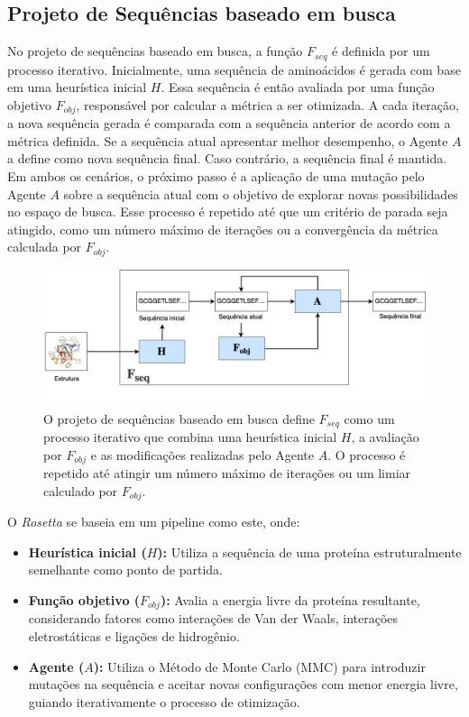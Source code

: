 \subsection{Projeto de Sequências baseado em busca}

No projeto de sequências baseado em busca, 
a função $F_{seq}$ é definida por um processo iterativo. 
Inicialmente, uma sequência de aminoácidos é gerada com base em uma heurística inicial $H$.
Essa sequência é então avaliada por uma função objetivo $F_{obj}$, 
responsável por calcular a métrica a ser otimizada.
A cada iteração, 
a nova sequência gerada é comparada com a sequência anterior de acordo com a métrica definida. 
Se a sequência atual apresentar melhor desempenho, o Agente $A$ a define como nova sequência final.
Caso contrário, a sequência final é mantida. 
Em ambos os cenários, o próximo passo é a aplicação de uma mutação pelo Agente $A$ sobre 
a sequência atual com o objetivo de explorar novas possibilidades no espaço de busca.
Esse processo é repetido até que um critério de parada seja atingido, 
como um número máximo de iterações ou a convergência da métrica calculada por $F_{obj}$.


\begin{figure}[H]
  \centering
  \includegraphics[width=.8\textwidth]{figuras/metodologia-SearchBased.jpg}
  \caption[Projeto de sequência baseado em busca]{O projeto de sequências baseado em busca define $F_{seq}$ 
           como um processo iterativo que combina uma 
           heurística inicial $H$, a avaliação por $F_{obj}$ e as modificações realizadas pelo Agente $A$. 
           O processo é repetido até atingir um número máximo de iterações ou um limiar calculado por $F_{obj}$.}
  \label{fig:seqdes_search_based}
\end{figure}

O \textit{Rosetta} \cite{Rosetta} se baseia em um pipeline como este, onde:

\begin{itemize}
    \item \textbf{Heurística inicial ($H$):}  
    Utiliza a sequência de uma proteína estruturalmente semelhante como ponto de partida.

    \item \textbf{Função objetivo ($F_{obj}$):}  
    Avalia a energia livre da proteína resultante, considerando fatores como interações de Van der Waals,
    interações eletrostáticas e ligações de hidrogênio.

    \item \textbf{Agente ($A$):}  
    Utiliza o Método de Monte Carlo (MMC) para introduzir mutações na sequência e aceitar novas configurações com menor energia livre,
    guiando iterativamente o processo de otimização.
\end{itemize}

